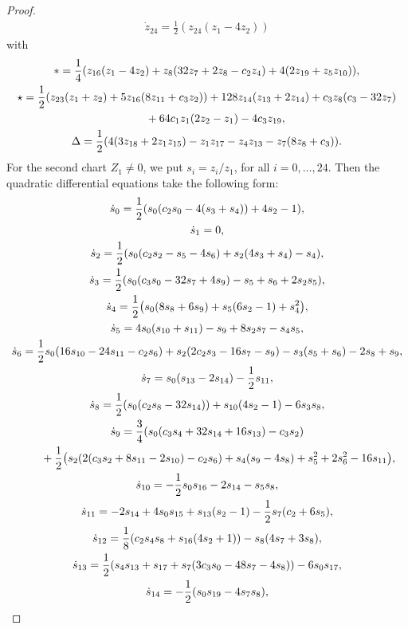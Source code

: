 \documentclass[pdftex]{sigma}
\numberwithin{equation}{section}
\begin{document}
\begin{proof}
\begin{gather*}
 \dot{z}_{24}= \frac{1}{2}(z_{24}(z_1-4z_2))
\end{gather*}
with
\begin{gather*}
 \ast=\frac{1}{4}(z_{16}(z_1-4z_2)+z_8(32z_7+2z_8-c_2z_4)+4(2z_{19}+z_5z_{10})), \\
 \star=\frac{1}{2}(z_{23}(z_1+z_2)+5z_{16}(8z_{11}+c_3z_2))+128z_{14}(z_{13}+2z_{14})+c_3z_8(c_3-32z_7)\\ \hphantom{\star=}{}
 +64c_1z_1(2z_2-z_1)-4c_3z_{19},\\
 \Delta =\frac{1}{2}(4(3z_{18}+2z_1z_{15})-z_1z_{17}-z_4z_{13}-z_7(8z_8+c_3)).
\end{gather*}
 For the second chart $Z_1\neq0$, we put $s_i=z_i/z_1$, for
all $i=0,\dots,24$. Then the quadratic differential equations take
the following form:
\begin{gather*}
 \dot{s}_0= \frac{1}{2}(s_0(c_2s_0-4(s_3+s_4))+4s_2-1) , \\
 \dot{s}_1= 0 , \\
 \dot{s}_2= \frac{1}{2}(s_0(c_2s_2-s_5-4s_6)+s_2(4s_3+s_4)-s_4) , \\
 \dot{s}_3= \frac{1}{2}(s_0(c_3s_0-32s_7+4s_9)-s_5+s_6+2s_2s_5) , \\
 \dot{s}_4= \frac{1}{2}\bigl(s_0(8s_8+6s_9)+s_5(6s_2-1)+s_4^2\bigr), \\
 \dot{s}_5= 4s_0(s_{10}+s_{11})-s_9+8s_2s_7-s_4s_5 , \\
 \dot{s}_6= \frac{1}{2}s_0(16s_{10}-24s_{11}-c_2s_6)+s_2(2c_2s_3-16s_7-s_9)-s_3(s_5+s_6)-2s_8+s_9 , \\
 \dot{s}_7= s_0(s_{13}-2s_{14})-\frac{1}{2}s_{11} , \\
 \dot{s}_8= \frac{1}{2}(s_0(c_2s_8-32s_{14}))+s_{10}(4s_2-1)-6s_3s_8, \\
 \dot{s}_9= \frac{3}{4}(s_0(c_3s_4+32s_{14}+16s_{13})-c_3s_2) \\ \hphantom{\dot{s_9}=}{}
 +\frac{1}{2}\bigl(s_2(2(c_3s_2+8s_{11}-2s_{10})-c_2s_6) +s_4(s_9-4s_8)+s_5^2+2s_6^2-16s_{11}\bigr), \\
 \dot{s}_{10}= -\frac{1}{2}s_0s_{16}-2s_{14}-s_5s_8 , \\
 \dot{s}_{11}= -2s_{14}+4s_0s_{15}+s_{13}(s_2-1)-\frac{1}{2}s_7(c_2+6s_5) , \\
 \dot{s}_{12}=\frac{1}{8}(c_2s_4s_8+s_{16}(4s_2+1))-s_8(4s_7+3s_8), \\
 \dot{s}_{13}= \frac{1}{2}(s_4s_{13}+s_{17}+s_7(3c_3s_0-48s_7-4s_8))-6s_0s_{17} , \\
 \dot{s}_{14}= -\frac{1}{2}(s_0s_{19}-4s_7s_8), \\

\end{gather*}
\end{proof}
\end{document}
